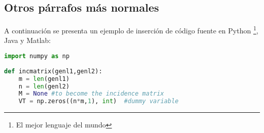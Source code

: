 		\lipsum[115]
		\vspace{\defaultnewlinesize}
		\lipsum[4]
		
	\subsection{Otros párrafos más normales}
	
		\lipsum[7]
		
		\newp \lipsum[2]
		
		
		\begin{multicols}{2}
		
			\lipsum[114]
			
			\vspace{-0.1cm}
			
			\lipsum[5]
			
		\end{multicols}
		
		\lipsum[4]
		
		
\newpage	



	A continuación se presenta un ejemplo de inserción de código fuente en Python \footnote{ El mejor lenguaje del mundo}, Java y Matlab:

\lstset{style=Python}
\begin{lstlisting}[language=Python, caption=Ejemplo en Python]
import numpy as np
 
def incmatrix(genl1,genl2):
    m = len(genl1)
    n = len(genl2)
    M = None #to become the incidence matrix
    VT = np.zeros((n*m,1), int)  #dummy variable
\end{lstlisting}


